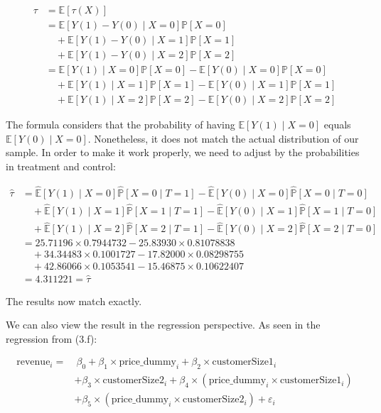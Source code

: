 \documentclass{article}
\begin{document}
\begin{align*}
    \tau &= \mathbb{E}[\tau(X)] \\
    & = \mathbb{E}[Y(1) - Y(0) \mid X = 0]\mathbb{P}[X = 0] \\
    &\quad + \mathbb{E}[Y(1) - Y(0) \mid X = 1]\mathbb{P}[X = 1] \\
    &\quad + \mathbb{E}[Y(1) - Y(0) \mid X = 2]\mathbb{P}[X = 2] \\
    & = \mathbb{E}[Y(1) \mid X = 0] \mathbb{P}[X = 0] - \mathbb{E}[Y(0) \mid X = 0] \mathbb{P}[X = 0] \\
    &\quad + \mathbb{E}[Y(1) \mid X = 1] \mathbb{P}[X = 1] - \mathbb{E}[Y(0) \mid X = 1] \mathbb{P}[X = 1] \\
    &\quad + \mathbb{E}[Y(1) \mid X = 2] \mathbb{P}[X = 2] - \mathbb{E}[Y(0) \mid X = 2] \mathbb{P}[X = 2] 
\end{align*}

The formula considers that the probability of having $\mathbb{E}[Y(1) \mid X = 0]$ equals $\mathbb{E}[Y(0) \mid X = 0]$. Nonetheless, it does not match the actual distribution of our sample. In order to make it work properly, we need to adjust by the probabilities in treatment and control:

\begin{align*}
    \hat{\tau} &= 
    \hat{\mathbb{E}}[Y(1) \mid X = 0] \hat{\mathbb{P}}[X = 0 \mid T = 1] - \hat{\mathbb{E}}[Y(0) \mid X = 0] \hat{\mathbb{P}}[X = 0 \mid T = 0] \\
    &\quad + \hat{\mathbb{E}}[Y(1) \mid X = 1] \hat{\mathbb{P}}[X = 1 \mid T = 1] - \hat{\mathbb{E}}[Y(0) \mid X = 1] \hat{\mathbb{P}}[X = 1 \mid T = 0] \\
    &\quad + \hat{\mathbb{E}}[Y(1) \mid X = 2] \hat{\mathbb{P}}[X = 2 \mid T = 1] - \hat{\mathbb{E}}[Y(0) \mid X = 2] \hat{\mathbb{P}}[X = 2 \mid T = 0] \\
    &= 25.71196 \times 0.7944732 - 25.83930 \times 0.81078838 \\
    &\quad + 34.34483 \times 0.1001727 - 17.82000 \times 0.08298755 \\
    &\quad + 42.86066 \times 0.1053541 - 15.46875 \times 0.10622407 \\
    &= 4.311221 = \hat{\tau}
\end{align*}

The results now match exactly.

We can also view the result in the regression perspective. As seen in the regression from (3.f):

\begin{align*}
    \text{revenue}_i =& \ \beta_0 + \beta_1 \times \text{price\_dummy}_i + \beta_2 \times \text{customerSize1}_i \\ &+ \beta_3 \times \text{customerSize2}_i + \beta_4 \times (\text{price\_dummy}_i \times \text{customerSize1}_i) \\ &+ \beta_5 \times (\text{price\_dummy}_i \times \text{customerSize2}_i) + \varepsilon_i
\end{align*}
\end{document}
